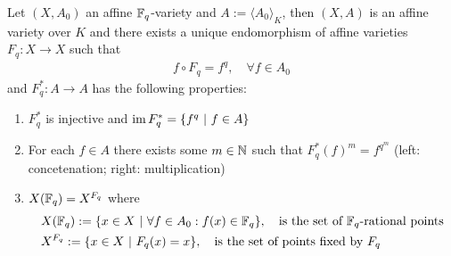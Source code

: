\documentclass[]{article}
\begin{document}
\begin{lemma}
    Let \((X,A_0)\) an affine \({\mathbb{F}}_q\)-variety and \(A:=\langle A_0 \rangle_K\), then \((X,A)\) is an affine variety over \(K\) 
    and there exists a unique endomorphism of affine varieties \(F_q:X\rightarrow X\) such that
    \begin{align*}
        f \circ F_q = f^q, \quad \forall f \in A_0
    \end{align*}
    and \(F_q^*:A \rightarrow A\) has the following properties:
    \begin{enumerate}
        \item \(F_q^*\) is injective and \(\operatorname{im} F^*_q = \{f^q \ | \ f \in A\}\)
        \item For each \(f \in A\) there exists some \(m \in {\mathbb{N}}\) such that \(F_q^*(f)^m=f^{q^m}\) (left: concetenation; right: multiplication)
        \item \(X({\mathbb{F}}_q) = X^{F_q}\) where 
        \begin{align*}
            &X({\mathbb{F}}_q):=\{x \in X \ | \ \forall f \in A_0: f(x) \in {\mathbb{F}}_q\}, \quad \text{is the set of \({\mathbb{F}}_q\)-rational points} \\
            &X^{F_q}:=\{x \in X \ | \ F_q(x)=x\}, \quad \text{is the set of points fixed by \(F_q\)}
        \end{align*}
    \end{enumerate}
    \label{Lemma: F_q^*}
\end{lemma}
\end{document}
